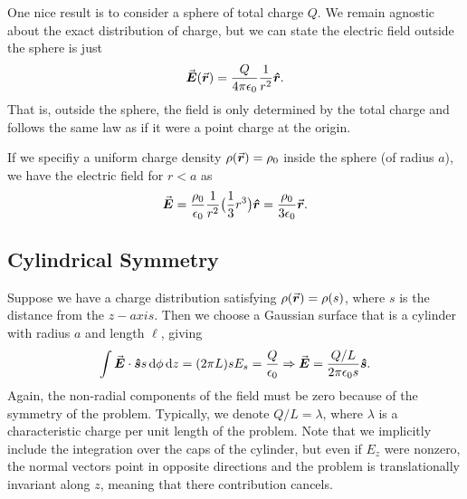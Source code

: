 One nice result is to consider a sphere of total charge $Q$.
We remain agnostic about the exact distribution of charge, but we can state the electric field outside the sphere is just
\begin{eqnarray}
    \va*{E}(\va*{r}) = \frac{Q}{4 \pi \epsilon_0} \frac{1}{r^2} \vu*{r}
.\end{eqnarray}
That is, outside the sphere, the field is only determined by the total charge and follows the same law as if it were a point charge at the origin.

If we specifiy a uniform charge density $\rho(\va*{r}) = \rho_0$ inside the sphere (of radius $a$), we have the electric field for $r < a$ as
\begin{eqnarray}
    \va*{E} = \frac{\rho_0}{\epsilon_0} \frac{1}{r^2} \big( \frac{1}{3}r^3 \big) \vu*{r} = \frac{\rho_0}{3 \epsilon_0} \va*{r}
.\end{eqnarray}

\subsection{Cylindrical Symmetry}

Suppose we have a charge distribution satisfying $\rho(\va*{r}) = \rho(s)$, where $s$ is the distance from the $z-axis$.
Then we choose a Gaussian surface that is a cylinder with radius $a$ and length $\ell$, giving
\begin{eqnarray}
    \int \va*{E} \cdot \vu*{s} s \dd{\phi} \dd{z} = (2 \pi L) s E_{s} = \frac{Q}{\epsilon_0} \Rightarrow \va*{E} = \frac{Q/L}{2 \pi \epsilon_0 s} \vu*{s}
.\end{eqnarray}
Again, the non-radial components of the field must be zero because of the symmetry of the problem.
Typically, we denote $Q/L = \lambda$, where $\lambda$ is a characteristic charge per unit length of the problem.
Note that we implicitly include the integration over the caps of the cylinder, but even if $E_{z}$ were nonzero, the normal vectors point in opposite directions and the problem is translationally invariant along $z$, meaning that there contribution cancels.








